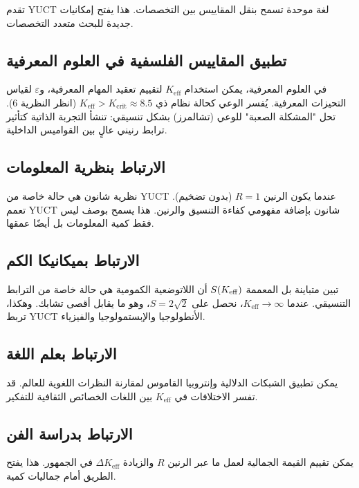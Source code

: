 \documentclass[11pt,a4paper]{article}
\newcommand{\eps}{\varepsilon}
\begin{document}
	تقدم YUCT لغة موحدة تسمح بنقل المقاييس بين التخصصات. هذا يفتح إمكانيات جديدة للبحث متعدد التخصصات.
	
	\subsection{تطبيق المقاييس الفلسفية في العلوم المعرفية}
	
	في العلوم المعرفية، يمكن استخدام \(K_{\mathrm{eff}}\) لتقييم تعقيد المهام المعرفية، و\(\eps\) لقياس التحيزات المعرفية. يُفسر الوعي كحالة نظام ذي \(K_{\mathrm{eff}} > K_{\mathrm{crit}} \approx 8.5\) (انظر النظرية 6). تحل "المشكلة الصعبة" للوعي (تشالمرز) بشكل تنسيقي: تنشأ التجربة الذاتية كتأثير ترابط رنيني عالٍ بين القواميس الداخلية.
	
	\subsection{الارتباط بنظرية المعلومات}
	
	نظرية شانون هي حالة خاصة من YUCT عندما يكون الرنين \(R = 1\) (بدون تضخيم). تعمم YUCT شانون بإضافة مفهومي كفاءة التنسيق والرنين. هذا يسمح بوصف ليس فقط كمية المعلومات بل أيضًا عمقها.
	
	\subsection{الارتباط بميكانيكا الكم}
	
	تبين متباينة بل المعممة \(S(\Keff)\) أن اللاتوضعية الكمومية هي حالة خاصة من الترابط التنسيقي. عندما \(K_{\mathrm{eff}} \to \infty\)، نحصل على \(S = 2\sqrt{2}\)، وهو ما يقابل أقصى تشابك. وهكذا، تربط YUCT الأنطولوجيا والإبستمولوجيا والفيزياء.
	
	\subsection{الارتباط بعلم اللغة}
	
	يمكن تطبيق الشبكات الدلالية وإنتروبيا القاموس لمقارنة النظرات اللغوية للعالم. قد تفسر الاختلافات في \(K_{\mathrm{eff}}\) بين اللغات الخصائص الثقافية للتفكير.
	
	\subsection{الارتباط بدراسة الفن}
	
	يمكن تقييم القيمة الجمالية لعمل ما عبر الرنين \(R\) والزيادة \(\Delta K_{\mathrm{eff}}\) في الجمهور. هذا يفتح الطريق أمام جماليات كمية.
	
\end{document}
